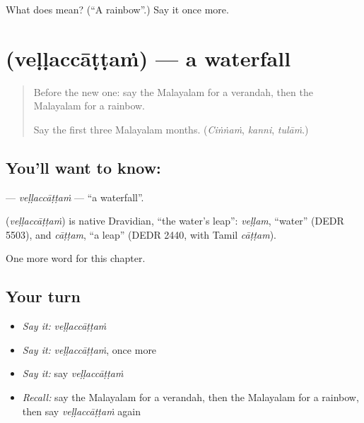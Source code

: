 \begin{tcolorbox}[breakable,colback=teal!4,colframe=teal!35!black,title={Before you move on}]
What does  mean? (\textquotedblleft{}A rainbow\textquotedblright{}.) Say it once more.
\end{tcolorbox}
\section[\texorpdfstring{\ml{വെള്ളച്ചാട്ടം} (veḷḷaccāṭṭaṁ)}{വെള്ളച്ചാട്ടം (veḷḷaccāṭṭaṁ)}]{ (veḷḷaccāṭṭaṁ) — a waterfall}

\label{lesson:ML-C160-vellaccattam}



\begin{quote}
Before the new one: say the Malayalam for a verandah, then the Malayalam for a rainbow.

Say the first three Malayalam months. (\emph{Ciṅṅaṁ}, \emph{kanni}, \emph{tulāṁ}.)
\end{quote}

\subsection*{You'll want to know: }
\textbf{} — \emph{veḷḷaccāṭṭaṁ} — \textquotedblleft{}a waterfall\textquotedblright{}.

\begin{cousinweb}
\textbf{} (\emph{veḷḷaccāṭṭaṁ}) is native Dravidian, \textquotedblleft{}the water's leap\textquotedblright{}: \emph{veḷḷam}, \textquotedblleft{}water\textquotedblright{} (DEDR 5503), and \emph{cāṭṭam}, \textquotedblleft{}a leap\textquotedblright{} (DEDR 2440, with Tamil \emph{cāṭṭam}).
\end{cousinweb}

\begin{grammarlens}[title={What you've built}]
One more word for this chapter.
\end{grammarlens}

\subsection*{Your turn}
\begin{itemize}
\raggedright
  \item \emph{Say it:} \emph{veḷḷaccāṭṭaṁ}
  \item \emph{Say it:} \emph{veḷḷaccāṭṭaṁ}, once more
  \item \emph{Say it:} say \emph{veḷḷaccāṭṭaṁ}
  \item \emph{Recall:} say the Malayalam for a verandah, then the Malayalam for a rainbow, then say \emph{veḷḷaccāṭṭaṁ} again
\end{itemize}

